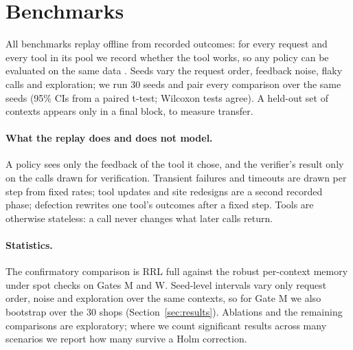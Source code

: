 \documentclass[11pt]{article}
\begin{document}
\section{Benchmarks}
\label{sec:bench}

All benchmarks replay offline from recorded outcomes: for every request and every tool in its
pool we record whether the tool works, so any policy can be evaluated on the same data
\citep{replay}. Seeds vary the request order, feedback noise, flaky calls and exploration; we run
30 seeds and pair every comparison over the same seeds (95\% CIs from a paired t-test; Wilcoxon
tests agree). A held-out set of contexts appears only in a final block, to measure transfer.

\paragraph{What the replay does and does not model.} A policy sees only the feedback of the
tool it chose, and the verifier's result only on the calls drawn for verification. Transient
failures and timeouts are drawn per step from fixed rates; tool updates and site redesigns are
a second recorded phase; defection rewrites one tool's outcomes after a fixed step. Tools are
otherwise stateless: a call never changes what later calls return.

\paragraph{Statistics.} The confirmatory comparison is RRL full against the robust per-context
memory under spot checks on Gates M and W. Seed-level intervals vary only request order,
noise and exploration over the same contexts, so for Gate M we also bootstrap over the 30 shops
(Section~\ref{sec:results}). Ablations and the remaining comparisons are exploratory; where we
count significant results across many scenarios we report how many survive a Holm
correction.
\end{document}
